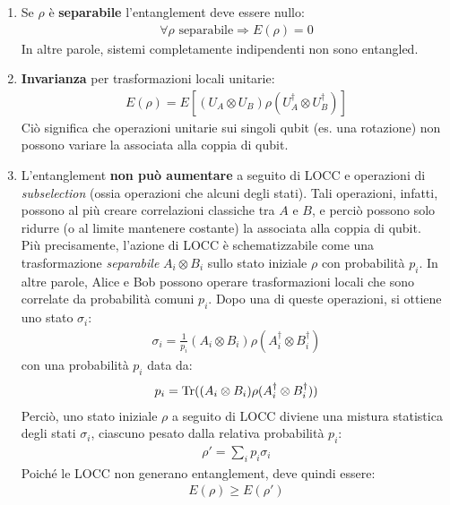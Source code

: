 \documentclass[../../InformazioneQuantistica.tex]{subfiles}
\begin{document}
\begin{enumerate}
\item Se $\rho$ è \textbf{separabile} l'entanglement deve essere nullo:
\begin{align*}
\forall \rho \text{ separabile} \Rightarrow E(\rho) = 0
\end{align*}
In altre parole, sistemi completamente indipendenti non sono entangled.
\item \textbf{Invarianza} per trasformazioni locali unitarie:
\begin{align*}
E(\rho) = E[(U_A \otimes U_B) \rho (U_A^\dag \otimes U_B^\dag)]
\end{align*}
Ciò significa che operazioni unitarie sui singoli qubit (es. una rotazione) non possono variare la  associata alla coppia di qubit.
\item L'entanglement \textbf{non può aumentare} a seguito di LOCC e operazioni di \textit{subselection} (ossia operazioni che  alcuni degli stati). Tali operazioni, infatti, possono al più creare correlazioni classiche tra $A$ e $B$, e perciò possono solo ridurre (o al limite mantenere costante) la  associata alla coppia di qubit.\\
Più precisamente, l'azione di LOCC è schematizzabile come una trasformazione \textit{separabile} $A_i \otimes B_i$ sullo stato iniziale $\rho$ con probabilità $p_i$. In altre parole, Alice e Bob possono operare trasformazioni locali che sono correlate da probabilità comuni $p_i$. Dopo una di queste operazioni, si ottiene uno stato $\sigma_i$:
\begin{align*}
    \sigma_i = \frac{1}{p_i}(A_i \otimes B_i) \rho (A_i^\dag \otimes B_i^\dag)
\end{align*}
con una probabilità $p_i$ data da:
\begin{align*}
    p_i = \operatorname{Tr}((A_i \otimes B_i) \rho (A_i^\dag \otimes B_i^\dag))
\end{align*}
Perciò, uno stato iniziale $\rho$ a seguito di LOCC diviene una mistura statistica degli stati $\sigma_i$, ciascuno pesato dalla relativa probabilità $p_i$:
\begin{align*}
    \rho' = \sum_i p_i \sigma_i
\end{align*}
Poiché le LOCC non generano entanglement, deve quindi essere:
\begin{align*}
    E(\rho) \geq E(\rho')
\end{align*}
\end{enumerate}
\end{document}
